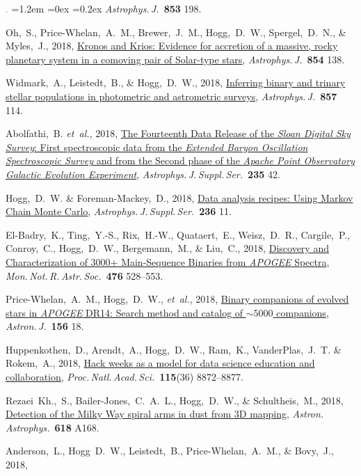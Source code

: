 \documentclass[10pt,letterpaper]{article}
\newcommand{\foreign}[1]{\textsl{#1}}
\newcommand{\etal}{\foreign{et~al.}}
\newcommand{\project}[1]{\textsl{#1}}
\newcommand{\doi}[2]{\href{http://dx.doi.org/#1}{{#2}}}
\newcommand{\deemph}[1]{\textcolor{grey}{\footnotesize{#1}}}
\newcommand{\pubnumber}[1]{\deemph{{#1}.}}
\newcounter{refpubnum}
\newcommand{\hogglist}{%
    \rightmargin=0in
    \leftmargin=1.2em
    \topsep=0ex
    \partopsep=0pt
    \itemsep=0.2ex
    \parsep=0pt
    \itemindent=-1.0\leftmargin
    \listparindent=0.0\leftmargin
    \settowidth{\labelsep}{~}
    \usecounter{refpubnum}
  }
\begin{document}
\begin{list}{\pubnumber{\therefpubnum}}{\hogglist}
\textit{Astrophys.\,J.}\ \textbf{853} 198.
\item
Oh,~S., Price-Whelan,~A.~M., Brewer,~J.~M., Hogg,~D.~W., Spergel,~D.~N., \& Myles,~J., 2018,
\doi{10.3847/1538-4357/aaab4d}{Kronos and Krios: Evidence for accretion of a massive, rocky planetary system in a comoving pair of Solar-type stars},
\textit{Astrophys.\,J.}\ \textbf{854} 138.
\item
Widmark,~A., Leistedt,~B., \& Hogg,~D.~W., 2018,
\doi{10.3847/1538-4357/aab7ee}{Inferring binary and trinary stellar populations in photometric and astrometric surveys},
\textit{Astrophys.\,J.}\ \textbf{857} 114.
\item
Abolfathi,~B. \etal, 2018,
\doi{10.3847/1538-4365/aa9e8a}{The Fourteenth Data Release of the \project{Sloan Digital Sky Survey}: First spectroscopic data from the \project{Extended Baryon Oscillation Spectroscopic Survey} and from the Second phase of the \project{Apache Point Observatory Galactic Evolution Experiment}},
\textit{Astrophys.\,J.\,Suppl.\,Ser.}\ \textbf{235} 42.
\item
Hogg,~D.~W. \& Foreman-Mackey,~D., 2018,
\doi{10.3847/1538-4365/aab76e}{Data analysis recipes: Using Markov Chain Monte Carlo},
\textit{Astrophys.\,J.\,Suppl.\,Ser.}\ \textbf{236} 11.
\item
El-Badry,~K., Ting,~Y.-S., Rix,~H.-W., Quataert,~E., Weisz,~D.~R., Cargile,~P., Conroy,~C., Hogg,~D.~W., Bergemann,~M., \& Liu,~C., 2018,
\doi{10.1093/mnras/sty240}{Discovery and Characterization of 3000+ Main-Sequence Binaries from \project{APOGEE} Spectra},
\textit{Mon.\,Not.\,R.\,Astr.\,Soc.}\ \textbf{476} 528--553.
\item
Price-Whelan,~A.~M., Hogg,~D.~W., \etal, 2018,
\doi{10.3847/1538-3881/aac387}{Binary companions of evolved stars in \project{APOGEE} DR14: Search method and catalog of $\sim5000$ companions},
\textit{Astron.\,J.}\ \textbf{156} 18.
\item
Huppenkothen,~D., Arendt,~A., Hogg,~D.~W., Ram,~K., VanderPlas,~J.~T. \& Rokem,~A., 2018,
\doi{10.1073/pnas.1717196115}{Hack weeks as a model for data science education and collaboration},
\textit{Proc.\,Natl.\,Acad.\,Sci.}\ \textbf{115}(36) 8872--8877.
\item
Rezaei~Kh.,~S., Bailer-Jones,~C.~A.~L., Hogg,~D.~W., \& Schultheis,~M., 2018,
\doi{10.1051/0004-6361/201833284}{Detection of the Milky Way spiral arms in dust from 3D mapping},
\textit{Astron.\,Astrophys.}\ \textbf{618} A168.
\item
Anderson,~L., Hogg~D.~W., Leistedt,~B., Price-Whelan,~A.~M., \& Bovy,~J., 2018,

\end{list}
\end{document}
